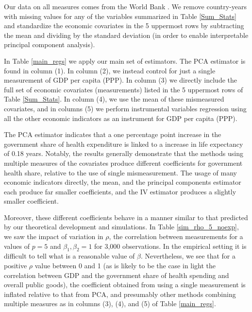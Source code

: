\documentclass[10pt]{article}
\begin{document}
        Our data on all measures comes from the World Bank \citep{the_world_bank_indicators_2021}. We remove country-years with missing values for any of the variables summarized in Table \ref{Sum_Stats} and standardize the economic covariates in the 5 uppermost rows by subtracting the mean and dividing by the standard deviation (in order to enable interpretable principal component analysis).

        

        In Table \ref{main_regs} we apply our main set of estimators. The PCA estimator is found in column (1). In column (2), we instead control for just a single measurement of GDP per capita (PPP). In column (3) we directly include the full set of economic covariates (measurements) listed in the 5 uppermost rows of Table \ref{Sum_Stats}. In column (4), we use the mean of these mismeasured covariates, and in columns (5) we perform instrumental variables regression using all the other economic indicators as an instrument for GDP per capita (PPP).

        

        The PCA estimator indicates that a one percentage point increase in the government share of health expenditure is linked to a increase in life expectancy of 0.18 years. Notably, the results generally demonstrate that the methods using multiple measures of the covariates produce different coefficients for government health share, relative to the use of single mismeasurement. The usage of many economic indicators directly, the mean, and the principal components estimator each produce far smaller coefficients, and the IV estimator produces a slightly smaller coefficient.

        Moreover, these different coefficients behave in a manner similar to that predicted by our theoretical development and simulations. In Table \ref{sim_rho_5_noexp}, we saw the impact of variation in $\rho$, the correlation between measurements for a values of $p = 5$ and $\beta_1, \beta_2 = 1$ for 3,000 observations. In the empirical setting it is difficult to tell what is a reasonable value of $\beta$. Nevertheless, we see that for a positive $\rho$ value between 0 and 1 (as is likely to be the case in light the correlation between GDP and the government share of health spending and overall public goods), the coefficient obtained from using a single measurement is inflated relative to that from PCA, and presumably other methods combining multiple measures as in columns (3), (4), and (5) of Table \ref{main_regs}.
\end{document}

